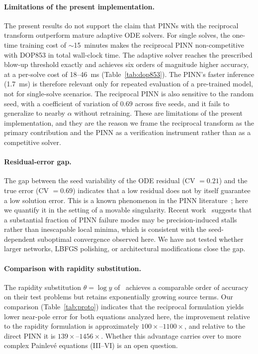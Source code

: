 \documentclass[11pt,a4paper]{article}
\theoremstyle{definition}
\begin{document}
\paragraph{Limitations of the present implementation.}
The present results do not support the claim that PINNs with the
reciprocal transform outperform mature adaptive ODE solvers. For
single solves, the one-time training cost of $\sim$15~minutes makes the reciprocal PINN non-competitive with DOP853 in total wall-clock time. The
adaptive solver reaches the prescribed blow-up threshold exactly and
achieves six orders of magnitude higher accuracy, at a per-solve cost
of 18--46~ms (Table~\ref{tab:dop853}). The PINN's faster inference
(1.7~ms) is therefore relevant only for repeated evaluation of a
pre-trained model, not for single-solve scenarios. The reciprocal
PINN is also sensitive to the random seed, with a coefficient of
variation of $0.69$ across five seeds, and it fails to generalize
to nearby $\alpha$ without retraining. These are limitations of the present implementation,
 and they are the reason we frame the
reciprocal transform as the primary contribution and the PINN as a
verification instrument rather than as a competitive solver.

\paragraph{Residual-error gap.}
The gap between the seed variability of the ODE residual (CV $= 0.21$)
and the true error (CV $= 0.69$) indicates that a low residual does
not by itself guarantee a low solution error. This is a known
phenomenon in the PINN literature~\cite{Krishnapriyan2021,FP64NeurIPS2025}; here we quantify it in the
setting of a movable singularity. Recent work~\cite{FP64NeurIPS2025} suggests that a substantial fraction of PINN failure modes may be precision-induced stalls rather than inescapable local minima, which is consistent with the seed-dependent suboptimal convergence observed here. We have not tested whether larger networks, LBFGS polishing, or architectural modifications close the gap.

\paragraph{Comparison with rapidity substitution.}
The rapidity substitution $\theta = \log y$ of~\citet{Cayuso2025}
achieves a comparable order of accuracy on their test problems but
retains exponentially growing source terms. Our comparison
(Table~\ref{tab:proto}) indicates that the reciprocal formulation
yields lower near-pole error for both equations analyzed here, the improvement relative to the rapidity formulation is approximately $100\times$--$1100\times$, and relative to the direct PINN it is $139\times$--$1456\times$. Whether this advantage carries over to more complex
Painlev\'e equations (III--VI) is an open question.
\end{document}
